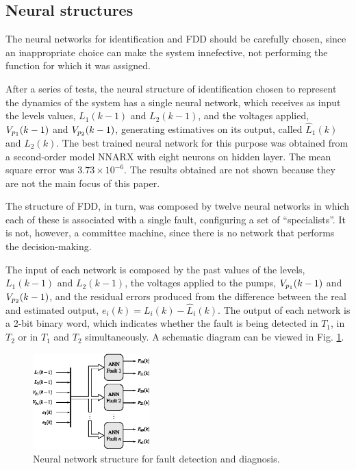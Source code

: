 \documentclass[10pt,fleqn,a4paper]{article}
\begin{document}
\subsection{Neural structures}
The neural networks for identification and FDD should be carefully chosen, since
an inappropriate choice can make the system innefective, not performing the
function for which it was assigned.

After a series of tests, the neural structure of identification chosen to
represent the dynamics of the system has a single neural network, which receives
as input the levels values, $L_1(k-1)$ and $L_2 (k-1)$, and the voltages
applied, $V_{p_{\tiny 1}} (k-1)$ and $V_{p_{\tiny 2}} (k-1)$, generating
estimatives on its output, called $\widehat{L}_1 (k)$ and $\widehat{L}_2 (k)$.
The best trained neural network for this purpose was obtained from a
second-order model NNARX with eight neurons on hidden layer. The mean square
error was $3.73 \times 10^{-6}$. The results obtained are not shown because they
are not the main focus of this paper.

The structure of FDD, in turn, was composed by twelve neural networks in which
each of these is associated with a single fault, configuring a set of
``specialists''. It is not, however, a committee machine, since there is no
network that performs the decision-making.

The input of each network is composed by the past values of the levels,
$L_1(k-1)$ and $L_2(k-1)$, the voltages applied to the pumps, $V_{p_{\tiny 1}}
(k-1)$ and $V_{p_{\tiny 2}} (k-1)$, and the residual errors produced from the
difference between the real and estimated output, $e_i (k) = L_i (k) -
\widehat{L}_i (k)$. The output of each network is a 2-bit binary word, which
indicates whether the fault is being detected in $T_1$, in $T_2$ or in $T_1$ and
$T_2$ simultaneously. A schematic diagram can be viewed in Fig.
\ref{fig:ann_fdd}.

\begin{figure}[htb]
\centering
    \includegraphics[width=0.4\textwidth]{imgs/ann_fdd}
    \caption{Neural network structure for fault detection and diagnosis.}
    \label{fig:ann_fdd}
\end{figure}
\end{document}

